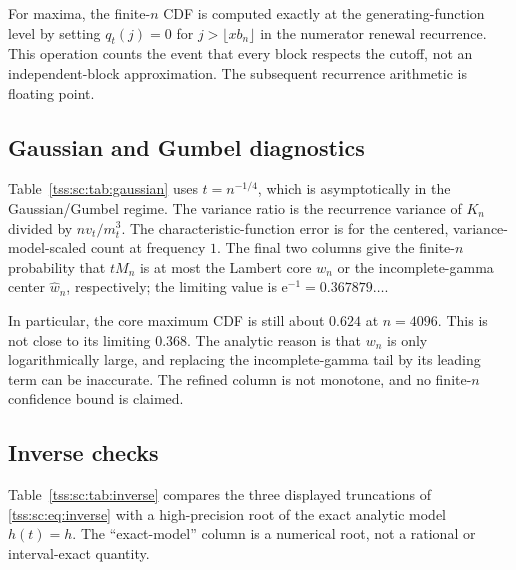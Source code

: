 \documentclass[11pt]{article}
\theoremstyle{remark}\newtheorem{remark}[theorem]{Remark}
\theoremstyle{definition}\newtheorem{definition}[theorem]{Definition}
\newcommand{\e}{\mathrm e}
\begin{document}
For maxima, the finite-$n$ CDF is computed exactly at the generating-function level by setting $q_t(j)=0$ for $j>\lfloor xb_n\rfloor$ in the numerator renewal recurrence. This operation counts the event that every block respects the cutoff, not an independent-block approximation. The subsequent recurrence arithmetic is floating point.
\begin{table}[htbp]\centering\small

\caption{Maximum-block CDFs at $x=1$ in the tempered window. The lattice cutoff and conditioning both matter at these finite sizes. Additional $x=2$ rows are in \texttt{data/maximum\_cdf.csv}.}
\label{tss:sc:tab:max}
\end{table}

\subsection{Gaussian and Gumbel diagnostics}
Table~\ref{tss:sc:tab:gaussian} uses $t=n^{-1/4}$, which is asymptotically in the Gaussian/Gumbel regime. The variance ratio is the recurrence variance of $K_n$ divided by $n v_t/m_t^3$. The characteristic-function error is for the centered, variance-model-scaled count at frequency $1$. The final two columns give the finite-$n$ probability that $tM_n$ is at most the Lambert core $w_n$ or the incomplete-gamma center $\widehat w_n$, respectively; the limiting value is $\e^{-1}=0.367879\ldots$.
\begin{table}[htbp]\centering\small

\caption{Gaussian-count and maximum diagnostics. The crude Gumbel center has a large finite-size error; the refined center helps but still shows lattice oscillations.}
\label{tss:sc:tab:gaussian}
\end{table}

In particular, the core maximum CDF is still about $0.624$ at $n=4096$. This is not close to its limiting $0.368$. The analytic reason is that $w_n$ is only logarithmically large, and replacing the incomplete-gamma tail by its leading term can be inaccurate. The refined column is not monotone, and no finite-$n$ confidence bound is claimed.

\subsection{Inverse checks}
Table~\ref{tss:sc:tab:inverse} compares the three displayed truncations of \eqref{tss:sc:eq:inverse} with a high-precision root of the exact analytic model $h(t)=h$. The ``exact-model'' column is a numerical root, not a rational or interval-exact quantity.
\begin{table}[htbp]\centering\small

\caption{Numerical errors in the free-energy inverse. The last column has the predicted $O(h^{5/2})$ scale.}
\label{tss:sc:tab:inverse}
\end{table}
\end{document}

